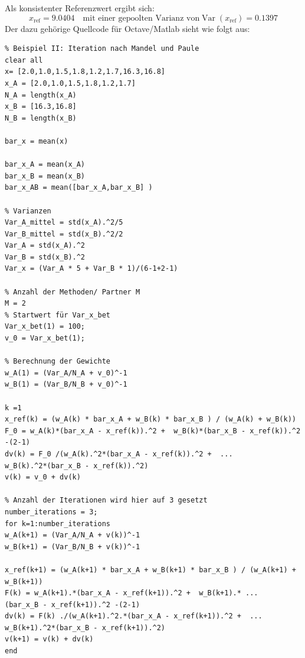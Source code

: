 Als konsistenter Referenzwert ergibt sich:
\begin{equation}
x_\mathrm{ref} = 9.0404 \quad \text{mit einer gepoolten Varianz von} 
\operatorname{Var}(x_\mathrm{ref}) = 0.1397
\end{equation}
\newpage
Der dazu gehörige Quellcode für Octave/Matlab sieht wie folgt aus: 
\begin{verbatim}
% Beispiel II: Iteration nach Mandel und Paule
clear all
x= [2.0,1.0,1.5,1.8,1.2,1.7,16.3,16.8]
x_A = [2.0,1.0,1.5,1.8,1.2,1.7]
N_A = length(x_A)
x_B = [16.3,16.8]
N_B = length(x_B)

bar_x = mean(x)

bar_x_A = mean(x_A)
bar_x_B = mean(x_B)
bar_x_AB = mean([bar_x_A,bar_x_B] )

% Varianzen
Var_A_mittel = std(x_A).^2/5
Var_B_mittel = std(x_B).^2/2
Var_A = std(x_A).^2
Var_B = std(x_B).^2
Var_x = (Var_A * 5 + Var_B * 1)/(6-1+2-1)

% Anzahl der Methoden/ Partner M
M = 2
% Startwert für Var_x_bet
Var_x_bet(1) = 100;
v_0 = Var_x_bet(1);

% Berechnung der Gewichte
w_A(1) = (Var_A/N_A + v_0)^-1
w_B(1) = (Var_B/N_B + v_0)^-1

k =1
x_ref(k) = (w_A(k) * bar_x_A + w_B(k) * bar_x_B ) / (w_A(k) + w_B(k))
F_0 = w_A(k)*(bar_x_A - x_ref(k)).^2 +  w_B(k)*(bar_x_B - x_ref(k)).^2 -(2-1)
dv(k) = F_0 /(w_A(k).^2*(bar_x_A - x_ref(k)).^2 +  ...
w_B(k).^2*(bar_x_B - x_ref(k)).^2)
v(k) = v_0 + dv(k)

% Anzahl der Iterationen wird hier auf 3 gesetzt
number_iterations = 3;
for k=1:number_iterations
w_A(k+1) = (Var_A/N_A + v(k))^-1
w_B(k+1) = (Var_B/N_B + v(k))^-1

x_ref(k+1) = (w_A(k+1) * bar_x_A + w_B(k+1) * bar_x_B ) / (w_A(k+1) + w_B(k+1))
F(k) = w_A(k+1).*(bar_x_A - x_ref(k+1)).^2 +  w_B(k+1).* ...
(bar_x_B - x_ref(k+1)).^2 -(2-1)
dv(k) = F(k) ./(w_A(k+1).^2.*(bar_x_A - x_ref(k+1)).^2 +  ...
w_B(k+1).^2*(bar_x_B - x_ref(k+1)).^2)
v(k+1) = v(k) + dv(k)
end
\end{verbatim}


